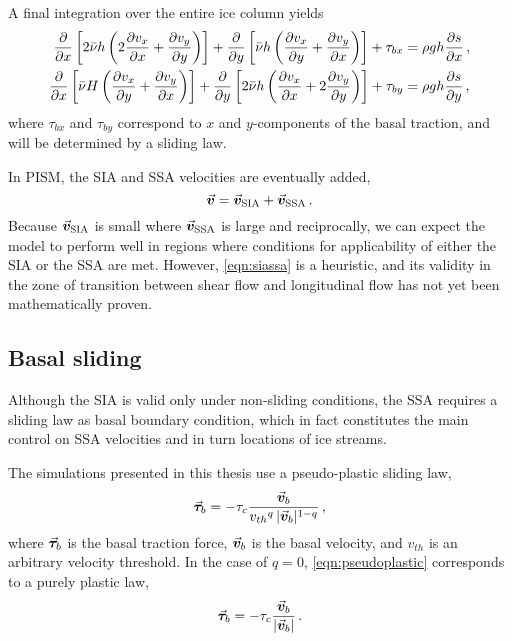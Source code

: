 \documentclass{article}
\newcommand{\vect}[1]{\va*{#1}} %
\newcommand{\vv}[0]{\vect{v}}           %
\newcommand{\vsia}[0]{\vv_{\mathrm{SIA}}}   %
\newcommand{\vssa}[0]{\vv_{\mathrm{SSA}}}   %
\begin{document}
A final integration over the entire ice column yields
\begin{subequations}
\begin{align}
    \label{eqn:vssa}
    \pdv{x} \left[2\bar{\nu}h
                  \left(2\pdv{v_x}{x} + \pdv{v_y}{y}\right) \right]
        + \pdv{y} \left[\bar{\nu}h
                        \left(\pdv{v_x}{y} + \pdv{v_y}{x}\right) \right]
        + \tau_{bx} &= \rho gh \pdv{s}{x} \,, \\
    \pdv{x} \left[\bar{\nu}H
                  \left(\pdv{v_x}{y} + \pdv{v_y}{x}\right) \right]
        + \pdv{y} \left[2\bar{\nu}h
                        \left(\pdv{v_x}{x} + 2\pdv{v_y}{y}\right) \right]
        + \tau_{by} &= \rho gh \pdv{s}{y} \,,
\end{align}
\end{subequations}
where $\tau_{bx}$ and $\tau_{by}$ correspond to $x$ and $y$-components of the
basal traction, and will be determined by a sliding law.

In PISM, the SIA and SSA velocities are eventually added,
\begin{equation}
    \label{eqn:siassa}
    \vv = \vsia + \vssa \,.
\end{equation}
Because $\vsia$ is small where $\vssa$ is large and
reciprocally, we can expect the model to perform well in regions where
conditions for applicability of either the SIA or the SSA are met. However,
\cref{eqn:siassa} is a heuristic, and its validity in the zone of
transition between shear flow and longitudinal flow has not yet been
mathematically proven.

\subsection{Basal sliding}

Although the SIA is valid only under non-sliding conditions, the SSA requires
a sliding law as basal boundary condition, which in fact constitutes the main
control on SSA velocities and in turn locations of ice streams.

The simulations presented in this thesis use a pseudo-plastic sliding law,
\begin{equation}
    \label{eqn:pseudoplastic}
    \vect{\tau}_b = -\tau_c \frac{\vv_b}{{v_{th}}^q\,|\vv_b|^{1-q}} \,,
\end{equation}
where $\vect{\tau}_b$ is the basal traction force, $\vv_b$ is the basal
velocity, and $v_{th}$ is an arbitrary velocity threshold. In the case of
$q=0$, \cref{eqn:pseudoplastic} corresponds to a purely plastic law,
\begin{equation}
    \label{eqn:plastic}
    \vect{\tau}_b = -\tau_c \frac{\vv_b}{|\vv_b|} \,.
\end{equation}
\end{document}
